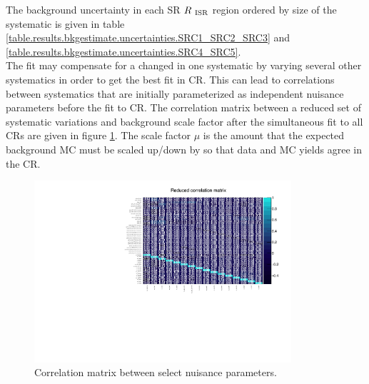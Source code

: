 \indent The background uncertainty in each SR $R_{~\mathrm{ISR}}$ region ordered by size of the systematic is given in table \ref{table.results.bkgestimate.uncertainties.SRC1_SRC2_SRC3} and \ref{table.results.bkgestimate.uncertainties.SRC4_SRC5}.  \\





\indent The fit may compensate for a changed in one systematic by varying several other systematics in order to get the best fit in CR. This can lead to correlations between systematics that are initially parameterized as independent nuisance parameters before the fit to CR.  The correlation matrix between a reduced set of systematic variations and background scale factor after the simultaneous fit to all CRs are given in figure \ref{figure.corrMatrix}.  The scale factor $\mu$ is the amount that the expected background MC must be scaled up/down by so that data and MC yields agree in the CR.  \\

\begin{figure}
	\begin{center}
		\includegraphics[width=0.85\textwidth, angle=90]{HistFitterStuff/corrMatrix.pdf}
		\caption{Correlation matrix between select nuisance parameters.}
		\label{figure.corrMatrix}
	\end{center}
\end{figure}


